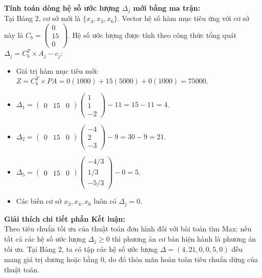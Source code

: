 \vspace{0.2cm}
\textbf{Tính toán dòng hệ số ước lượng $\Delta_j$ mới bằng ma trận:} \\
Tại Bảng 2, cơ sở mới là $\{x_4, x_3, x_6\}$. Vector hệ số hàm mục tiêu ứng với cơ sở này là $C_b = \begin{pmatrix} 0 \\ 15 \\ 0 \end{pmatrix}$. 
Hệ số ước lượng được tính theo công thức tổng quát $\Delta_j = C_b^T \times A_j - c_j$:
\begin{itemize}
    \item Giá trị hàm mục tiêu mới: $Z = C_b^T \times PA = 0(1000) + 15(5000) + 0(1000) = 75000$.
    \item $\Delta_1 = \begin{pmatrix} 0 & 15 & 0 \end{pmatrix} \begin{pmatrix} 1 \\ 1 \\ -2 \end{pmatrix} - 11 = 15 - 11 = 4$.
    \item $\Delta_2 = \begin{pmatrix} 0 & 15 & 0 \end{pmatrix} \begin{pmatrix} -4 \\ 2 \\ -3 \end{pmatrix} - 9 = 30 - 9 = 21$.
    \item $\Delta_5 = \begin{pmatrix} 0 & 15 & 0 \end{pmatrix} \begin{pmatrix} -4/3 \\ 1/3 \\ -5/3 \end{pmatrix} - 0 = 5$.
    \item Các biến cơ sở $x_3, x_4, x_6$ luôn có $\Delta_j = 0$.
\end{itemize}


\vspace{0.3cm}
\textbf{Giải thích chi tiết phần Kết luận:} \\
Theo tiêu chuẩn tối ưu của thuật toán đơn hình đối với bài toán tìm Max: nếu tất cả các hệ số ước lượng $\Delta_j \ge 0$ thì phương án cơ bản hiện hành là phương án tối ưu. 
Tại Bảng 2, ta có tập các hệ số ước lượng $\Delta = (4, 21, 0, 0, 5, 0)$ đều mang giá trị dương hoặc bằng $0$, do đó thỏa mãn hoàn toàn tiêu chuẩn dừng của thuật toán.

